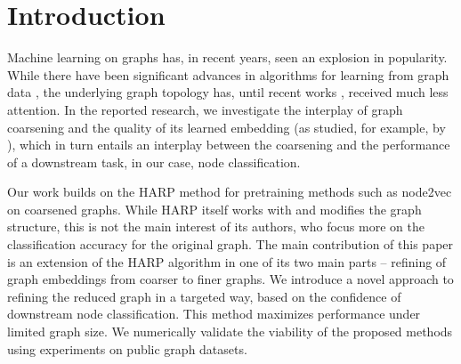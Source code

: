 \section{Introduction}
Machine learning on graphs has, in recent years, seen an explosion in popularity. While there have been significant advances in algorithms for learning from graph data \cite{defferrard_convolutional_2016,kipf_semi-supervised_2017}, the underlying graph topology has, until recent works \cite{topping_understanding_2021,velickovic_geometric_2021}, received much less attention. In the reported research, we investigate the interplay of graph coarsening and the quality of its learned embedding (as studied, for example, by \cite{akyildiz_understanding_2020,makarov_survey_2021}), which in turn entails an interplay between the coarsening and the performance of a downstream task, in our case, node classification.

Our work builds on the HARP method \cite{chen_harp_2018} for pretraining methods such as node2vec \cite{grover_node2vec_2016} on coarsened graphs. While HARP itself works with and modifies the graph structure, this is not the main interest of its authors, who focus more on the classification accuracy for the original graph. The main contribution of this paper is an extension of the HARP algorithm in one of its two main parts -- refining of graph embeddings from coarser to finer graphs. We introduce a novel approach to refining the reduced graph in a targeted way, based on the confidence of downstream node classification. This method maximizes performance under limited graph size. We numerically validate the viability of the proposed methods using experiments on public graph datasets.
